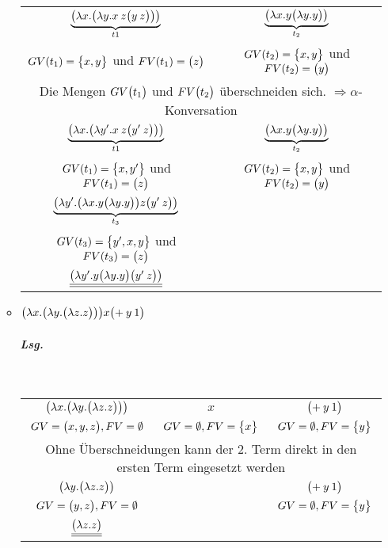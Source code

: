 \documentclass{scrreprt}
\begin{document}
\begin{enumerate}[(a)]
\begin{itemize}
    \begin{tabular}{cc}
      $\underset{t1}{\underbrace{\qty\big(\lambda x.\qty\big(\lambda y.x \: z \qty\big(y \: z)))}}$ & $\underset{t_2}{\underbrace{\qty\big(\lambda x.y \qty\big(\lambda y.y))}}$ \\
      $GV(t_1) = \qty\big{x, y}$ und $FV(t_1) = \qty\big(z)$ & $GV(t_2) = \qty\big{x, y}$ und $FV(t_2) = \qty\big(y)$ \\
      \multicolumn{2}{c}{Die Mengen $GV\qty\big(t_1)$ und $FV\qty\big(t_2)$ überschneiden sich. $\Rightarrow \alpha$-Konversation} \\
      \hline
      $\underset{t1}{\underbrace{\qty\big(\lambda x.\qty\big(\lambda y'.x \: z \qty\big(y' \: z)))}}$ & $\underset{t_2}{\underbrace{\qty\big(\lambda x.y \qty\big(\lambda y.y))}}$ \\
      $GV(t_1) = \qty\big{x, y'}$ und $FV(t_1) = \qty\big(z)$ & $GV(t_2) = \qty\big{x, y}$ und $FV(t_2) = \qty\big(y)$ \\
      \hline
      $\underset{t_3}{\underbrace{\qty\big(\lambda y'.\qty\big(\lambda x.y \qty\big(\lambda y.y)) z \qty\big(y' \: z))}}$ \\
      $GV(t_3) = \qty\big{y', x, y}$ und $FV(t_3) = \qty\big(z)$  \\
      \hline
      $\underline{\underline{\qty\big(\lambda y'.y \qty\big(\lambda y.y) \qty\big(y' \: z))}}$ \\
    \end{tabular}

  \item $\qty\big(\lambda x.\qty\big(\lambda y.\qty\big(\lambda z.z))) x \qty\big(+ \: y \: 1)$

    \subparagraph{Lsg.} \:\\

    \begin{tabular}{ccc}
      $\qty\big(\lambda x.\qty\big(\lambda y.\qty\big(\lambda z.z)))$ & $x$ & $\qty\big(+ \: y \: 1)$ \\
      $GV = \qty\big(x, y, z), FV = \emptyset$ & $GV = \emptyset, FV = \qty\big{x}$ & $GV = \emptyset, FV = \qty\big{y}$ \\
      \hline
      \multicolumn{3}{c}{Ohne Überschneidungen kann der 2. Term direkt in den ersten Term eingesetzt werden} \\
      \hline
      $\qty\big(\lambda y.\qty\big(\lambda z.z))$ & & $\qty\big(+ \: y \: 1)$ \\
      $GV = \qty\big(y, z), FV = \emptyset$ & & $GV = \emptyset, FV = \qty\big{y}$ \\
      \hline
      $\underline{\underline{\qty\big(\lambda z.z)}}$
    \end{tabular}


\end{itemize}
\end{enumerate}
\end{document}
